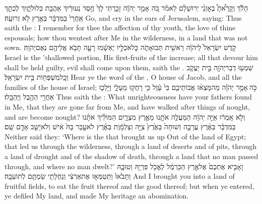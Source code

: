 {הָלֹ֡ךְ וְֽקָרָ֩אתָ֩ בְאׇזְנֵ֨י יְרוּשָׁלַ֜͏ִם לֵאמֹ֗ר כֹּ֚ה אָמַ֣ר יְהֹוָ֔ה זָכַ֤רְתִּי לָךְ֙ חֶ֣סֶד נְעוּרַ֔יִךְ אַהֲבַ֖ת כְּלוּלֹתָ֑יִךְ לֶכְתֵּ֤ךְ אַֽחֲרַי֙ בַּמִּדְבָּ֔ר בְּאֶ֖רֶץ לֹ֥א זְרוּעָֽה׃}
{Go, and cry in the ears of Jerusalem, saying: Thus saith the \lord: I remember for thee the affection of thy youth, the love of thine espousals; how thou wentest after Me in the wilderness, in a land that was not sown.}
{קֹ֤דֶשׁ יִשְׂרָאֵל֙ לַיהֹוָ֔ה רֵאשִׁ֖ית תְּבוּאָתֹ֑ה כׇּל\maqqaf אֹכְלָ֣יו יֶאְשָׁ֔מוּ רָעָ֛ה תָּבֹ֥א אֲלֵיהֶ֖ם נְאֻם\maqqaf יְהֹוָֽה׃ \petucha }
{Israel is the \lord\textsc{’s}\space hallowed portion, His first-fruits of the increase; all that devour him shall be held guilty, evil shall come upon them, saith the \lord.}
\newperek
{}
\label{haft_43}
\setcounter{chap}{2}
\setcounter{verse}{4}
{שִׁמְע֥וּ דְבַר\maqqaf יְהֹוָ֖ה בֵּ֣ית יַעֲקֹ֑ב וְכׇֽל\maqqaf מִשְׁפְּח֖וֹת בֵּ֥ית יִשְׂרָאֵֽל׃}
{Hear ye the word of the \lord, O house of Jacob, and all the families of the house of Israel;}
{כֹּ֣ה \legarmeh  אָמַ֣ר יְהֹוָ֗ה מַה\maqqaf מָּצְא֨וּ אֲבוֹתֵיכֶ֥ם בִּי֙ עָ֔וֶל כִּ֥י רָחֲק֖וּ מֵעָלָ֑י וַיֵּ֥לְכ֛וּ אַחֲרֵ֥י הַהֶ֖בֶל וַיֶּהְבָּֽלוּ׃}
{Thus saith the \lord: What unrighteousness have your fathers found in Me, that they are gone far from Me, and have walked after things of nought, and are become nought?}
{וְלֹ֣א אָֽמְר֔וּ אַיֵּ֣ה יְהֹוָ֔ה הַמַּעֲלֶ֥ה אֹתָ֖נוּ מֵאֶ֣רֶץ מִצְרָ֑יִם הַמּוֹלִ֨יךְ אֹתָ֜נוּ בַּמִּדְבָּ֗ר בְּאֶ֨רֶץ עֲרָבָ֤ה וְשׁוּחָה֙ בְּאֶ֙רֶץ֙ צִיָּ֣ה וְצַלְמָ֔וֶת בְּאֶ֗רֶץ לֹא\maqqaf עָ֤בַר בָּהּ֙ אִ֔ישׁ וְלֹא\maqqaf יָשַׁ֥ב אָדָ֖ם שָֽׁם׃}
{Neither said they: ‘Where is the \lord\space that brought us up Out of the land of Egypt; that led us through the wilderness, through a land of deserts and of pits, through a land of drought and of the shadow of death, through a land that no man passed through, and where no man dwelt?’}
{וָאָבִ֤יא אֶתְכֶם֙ אֶל\maqqaf אֶ֣רֶץ הַכַּרְמֶ֔ל לֶאֱכֹ֥ל פִּרְיָ֖הּ וְטוּבָ֑הּ וַתָּבֹ֙אוּ֙ וַתְּטַמְּא֣וּ אֶת\maqqaf אַרְצִ֔י וְנַחֲלָתִ֥י שַׂמְתֶּ֖ם לְתוֹעֵבָֽה׃}
{And I brought you into a land of fruitful fields, to eat the fruit thereof and the good thereof; but when ye entered, ye defiled My land, and made My heritage an abomination.}
